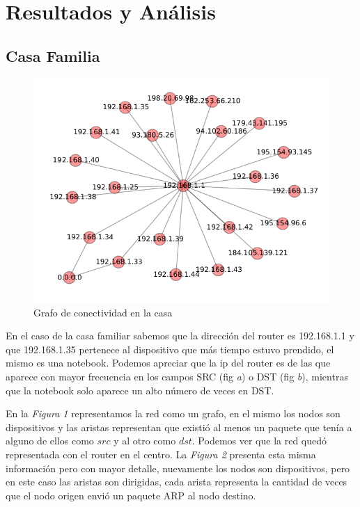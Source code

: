 \section{Resultados y An\'alisis}

\subsection{Casa Familia}

\begin{figure}[h!]
    \begin{center}
        \includegraphics[scale=.6]{resultados/casa/conectividadNX.png}
		  \caption{Grafo de conectividad en la casa}
	\end{center}
\end{figure}
	
En el caso de la casa familiar sabemos que la direcci\'on del router
es 192.168.1.1 y que 192.168.1.35 pertenece al dispositivo que m\'as tiempo estuvo
prendido, el mismo es una notebook. Podemos apreciar que la ip del
router es de las que aparece con mayor frecuencia en los campos SRC (fig \emph{a}) 
o DST (fig \emph{b}), mientras que la notebook solo aparece un alto n\'umero de 
veces en DST. 

En la \emph{Figura 1} representamos la red como un grafo, en el mismo los
nodos son dispositivos y las aristas representan que existi\'o al menos
un paquete que ten\'ia a alguno de ellos como $src$ y al otro como $dst$.
Podemos ver que la red qued\'o representada con el router en el centro.
La \emph{Figura 2} presenta esta misma informaci\'on
pero con mayor detalle, nuevamente los nodos son dispositivos, pero en este
caso las aristas son dirigidas, cada arista representa la cantidad de veces
que el nodo origen envi\'o un paquete ARP al nodo destino.

